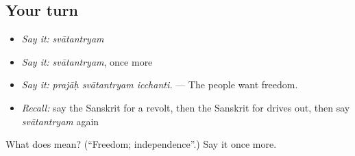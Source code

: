 \subsection*{Your turn}
\begin{itemize}
\raggedright
  \item \emph{Say it:} \emph{svātantryam}
  \item \emph{Say it:} \emph{svātantryam}, once more
  \item \emph{Say it:} \emph{prajāḥ svātantryam icchanti.} — The people want freedom.
  \item \emph{Recall:} say the Sanskrit for a revolt, then the Sanskrit for drives out, then say \emph{svātantryam} again
\end{itemize}

\begin{tcolorbox}[breakable,colback=teal!4,colframe=teal!35!black,title={Before you move on}]
What does  mean? (\textquotedblleft{}Freedom; independence\textquotedblright{}.) Say it once more.
\end{tcolorbox}
